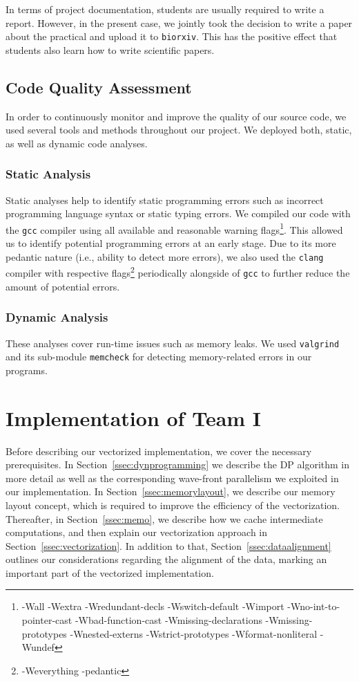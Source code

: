 \documentclass[runningheads,a4paper]{llncs}
\begin{document}
In terms of project documentation, students are usually required to write a report. However, in the present case, we jointly took the decision to write a paper 
about the practical and upload it to \verb|biorxiv|. This has the positive effect that students also learn how to write scientific papers.

\subsection{Code Quality Assessment}
In order to continuously monitor and improve the quality of our source code, we used several tools and methods throughout our project.
We deployed both, static, as well as dynamic code analyses.

\subsubsection{Static Analysis}
Static analyses help to identify static programming errors such as incorrect programming language syntax or static typing errors.
We compiled our code with the \texttt{gcc} compiler using all available and reasonable warning flags\footnote{-Wall -Wextra -Wredundant-decls -Wswitch-default -Wimport -Wno-int-to-pointer-cast -Wbad-function-cast -Wmissing-declarations -Wmissing-prototypes -Wnested-externs -Wstrict-prototypes -Wformat-nonliteral -Wundef}. 
This allowed us to identify potential programming errors at an early stage. 
Due to its more pedantic nature (i.e., ability to detect more errors), we also used the \texttt{clang} compiler with respective flags\footnote{-Weverything -pedantic} 
periodically alongside of \texttt{gcc} to further reduce the amount of potential errors.

\subsubsection{Dynamic Analysis}
These analyses cover run-time issues such as memory leaks.
We used \texttt{valgrind} and its sub-module \texttt{memcheck} for detecting memory-related errors in our programs. 


\section{Implementation of Team I}
\label{sec:implementation-1}

Before describing our vectorized implementation, we cover the necessary prerequisites.
In Section~\ref{ssec:dynprogramming} we describe the DP algorithm in more detail as well as the corresponding wave-front parallelism we exploited in our implementation. 
In Section~\ref{ssec:memorylayout}, we describe our memory layout concept, which is required to improve the efficiency of the vectorization. 
Thereafter, in Section~\ref{ssec:memo}, we describe how we cache intermediate computations, and then explain our vectorization approach in Section~\ref{ssec:vectorization}. 
In addition to that, Section~\ref{ssec:dataalignment} outlines our considerations regarding the alignment of the data, marking an important part of the vectorized implementation. 
\end{document}

